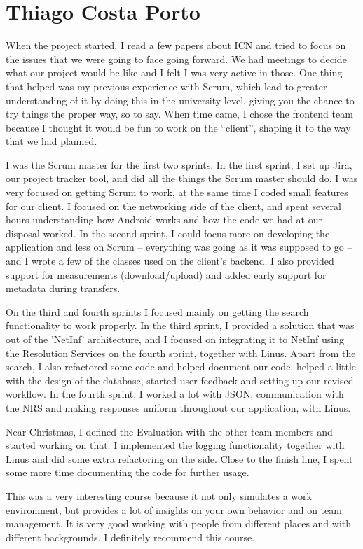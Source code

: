 \section{Thiago Costa Porto}
When the project started, I read a few papers about ICN and tried to focus on the issues that we were going to face going forward. We had meetings to decide what our project would be like and I felt I was very active in those. One thing that helped was my previous experience with Scrum, which lead to greater understanding of it by doing this in the university level, giving you the chance to try things the proper way, so to say. When time came, I chose the frontend team because I thought it would be fun to work on the ``client'', shaping it to the way that we had planned.

I was the Scrum master for the first two sprints. In the first sprint, I set up Jira, our project tracker tool, and did all the things the Scrum master should do. I was very focused on getting Scrum to work, at the same time I coded small features for our client. I focused on the networking side of the client, and spent several hours understanding how Android works and how the code we had at our disposal worked. In the second sprint, I could focus more on developing the application and less on Scrum -- everything was going as it was supposed to go -- and I wrote a few of the classes used on the client's backend. I also provided support for measurements (download/upload) and added early support for metadata during transfers.

On the third and fourth sprints I focused mainly on getting the search functionality to work properly. In the third sprint, I provided a solution that was out of the 'NetInf' architecture, and I focused on integrating it to NetInf using the Resolution Services on the fourth sprint, together with Linus. Apart from the search, I also refactored some code and helped document our code, helped a little with the design of the database, started user feedback and setting up our revised workflow. In the fourth sprint, I worked a lot with JSON, communication with the NRS and making responses uniform throughout our application, with Linus.

Near Christmas, I defined the Evaluation with the other team members and started working on that. I implemented the logging functionality together with Linus and did some extra refactoring on the side. Close to the finish line, I spent some more time documenting the code for further usage.

This was a very interesting course because it not only simulates a work environment, but provides a lot of insights on your own behavior and on team management. It is very good working with people from different places and with different backgrounds. I definitely recommend this course.

